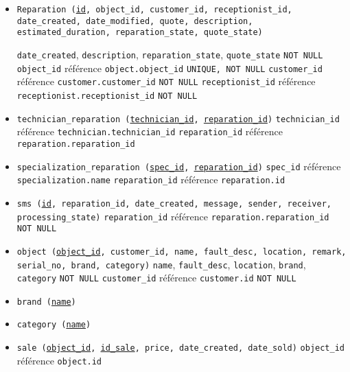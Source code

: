 \documentclass{article}
\newcommand{\ul}{\underline}
\newcommand{\ttt}{\texttt}
\begin{document}
\begin{itemize}
    \item \ttt{Reparation (\ul{id}, object\_id, customer\_id, receptionist\_id, date\_created, date\_modified, quote, description, estimated\_duration, reparation\_state, quote\_state)}
    
    \subitem \ttt{date\_created}, \ttt{description}, \ttt{reparation\_state}, \ttt{quote\_state} \ttt{NOT NULL}
    \subitem \ttt{object\_id} référence \ttt{object.object\_id} \ttt{UNIQUE, NOT NULL}
    \subitem \ttt{customer\_id} référence \ttt{customer.customer\_id} \ttt{NOT NULL}
    \subitem \ttt{receptionist\_id} référence \ttt{receptionist.receptionist\_id} \ttt{NOT NULL}

    \item \ttt{technician\_reparation (\ul{technician\_id}, \ul{reparation\_id})}
    \subitem \ttt{technician\_id} référence \ttt{technician.technician\_id} 
    \subitem \ttt{reparation\_id} référence \ttt{reparation.reparation\_id}

    \item \ttt{specialization\_reparation (\ul{spec\_id}, \ul{reparation\_id})}
    \subitem \ttt{spec\_id} référence \ttt{specialization.name}
    \subitem \ttt{reparation\_id} référence \ttt{reparation.id}

    \item \ttt{sms (\ul{id}, reparation\_id, date\_created, message, sender, receiver, processing\_state)}
    \subitem \ttt{reparation\_id} référence \ttt{reparation.reparation\_id} \ttt{NOT NULL}

    \item \ttt{object (\ul{object\_id}, customer\_id, name, fault\_desc, location, remark, serial\_no, brand, category)}
    \subitem \ttt{name}, \ttt{fault\_desc}, \ttt{location}, \ttt{brand}, \ttt{category} \ttt{NOT NULL}
    \subitem \ttt{customer\_id} référence \ttt{customer.id} \ttt{NOT NULL}

    \item \ttt{brand (\ul{name})}
    \item \ttt{category (\ul{name})}
    \item \ttt{sale (\ul{object\_id}, \ul{id\_sale}, price, date\_created, date\_sold)}
    \subitem \ttt{object\_id} référence \ttt{object.id}

\end{itemize}


\pagebreak
\end{document}
